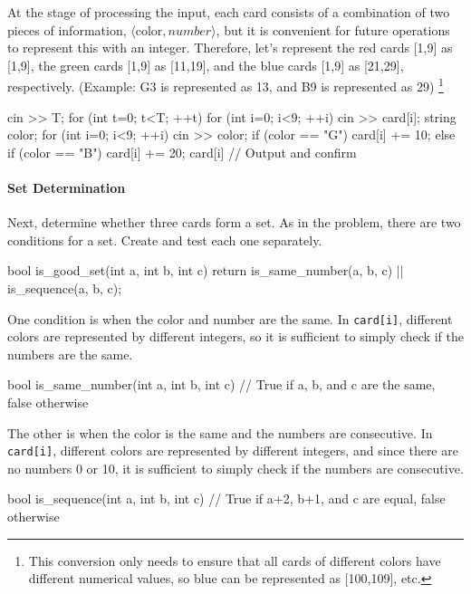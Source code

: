 At the stage of processing the input, each card consists of a combination of two pieces of information, $\langle\mbox{color},number\rangle$, but it is convenient for future operations to represent this with an integer. Therefore, let's represent the red cards [1,9] as [1,9], the green cards [1,9] as [11,19], and the blue cards [1,9] as [21,29], respectively. (Example: G3 is represented as 13, and B9 is represented as 29) \footnote{This conversion only needs to ensure that all cards of different colors have different numerical values, so blue can be represented as [100,109], etc.}


\begin{cbox}
    cin >> T;
    for (int t=0; t<T; ++t) {
        for (int i=0; i<9; ++i) {
          cin >> card[i];
        }
        string color;
        for (int i=0; i<9; ++i) {
          cin >> color;
            if (color == "G") card[i] += 10;
            else if (color == "B") card[i] += 20;
          card[i] // Output and confirm
        }
    }
\end{cbox}

\paragraph{Set Determination}

Next, determine whether three cards form a set.
As in the problem, there are two conditions for a set. Create and test each one separately.

\begin{cbox}
bool is_good_set(int a, int b, int c) {
  return is_same_number(a, b, c) || is_sequence(a, b, c);
}    
\end{cbox}

One condition is when the color and number are the same. In \texttt{card[i]}, different colors are represented by different integers, so it is sufficient to simply check if the numbers are the same.

\begin{cbox}
bool is_same_number(int a, int b, int c) {
  // True if a, b, and c are the same, false otherwise
}    
\end{cbox}

The other is when the color is the same and the numbers are consecutive. In \texttt{card[i]}, different colors are represented by different integers, and since there are no numbers 0 or 10, it is sufficient to simply check if the numbers are consecutive.

\begin{cbox}
bool is_sequence(int a, int b, int c) {
  // True if a+2, b+1, and c are equal, false otherwise
}    
\end{cbox}

